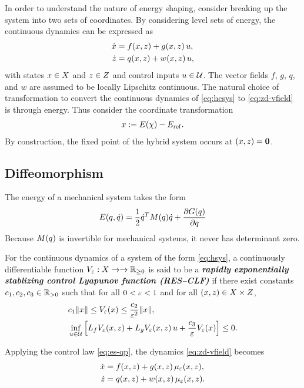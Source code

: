 \documentclass[twocolumn]{article}
\begin{document}
In order to understand the nature of energy shaping, consider breaking up the system into two sets of coordinates.
%
By considering level sets of energy, the continuous dynamics can be expressed as
\begin{align}
  \nonumber
  \dot {x} &= f(x, z) + g(x, z) \, u,\\
  \dot {z} &= q(x, z) + w(x, z) \, u,
  \label{eq:zd-vfield}
\end{align}
%
with states $x \in X$ and $z \in Z$ and control inputs $u \in \mathcal{U}$.
%
The vector fields $f$, $g$, $q$, and $w$ are assumed to be locally Lipschitz continuous.
%
The natural choice of transformation to convert the continuous dynamics of \eqref{eq:hcsys} to \eqref{eq:zd-vfield} is through energy.
%
Thus consider the coordinate transformation
\begin{align}
  x := E(\chi) - E_{\mathrm{ref}}.
\end{align}
By construction, the fixed point of the hybrid system occurs at $(x, z) = {\mathbf 0}$.
%

\subsection{Diffeomorphism}
The energy of a mechanical system takes the form
\begin{align}
  E(q, \dot{q}) = \frac{1}{2} \dot{q}^{T} M(q) \dot{q} + \frac{\partial{G(q)}}{\partial{q}}
\end{align}
Because $M(q)$ is invertible for mechanical systems, it never has determinant zero.

\begin{definition}
  For the continuous dynamics of a system of the form \eqref{eq:hsys}, a continuously differentiable function $V_{\varepsilon} : X \to \to \mathbb{R}_{\geq 0}$ is said to be a {\bf \em rapidly exponentially stablizing control Lyapunov function (RES--CLF)} if there exist constants $c_{1}, c_{2}, c_{3} \in \mathbb{R}_{> 0}$ such that for all $0 < \varepsilon < 1$ and for all $(x, z) \in X \times Z$,
  \begin{align}
    &c_{1} \| x \| \leq V_{\varepsilon}(x) \leq \frac{c_{2}}{\varepsilon^{2}} \| x \|,\\
    \nonumber
    &\inf_{u \in \mathcal{U}} \left[ L_{f} V_{\varepsilon}(x, z) + L_{g} V_{\varepsilon}(x, z) \, u + \frac{c_{3}}{\varepsilon} V_{\varepsilon}(x) \right] \leq 0.
  \end{align}
\end{definition}


Applying the control law \eqref{eq:es-qp}, the dynamics \eqref{eq:zd-vfield} becomes
\begin{align}
  \nonumber
  \dot {x} &= f(x, z) + g(x, z) \, \mu_{\varepsilon}(x, z),\\
  \dot {z} &= q(x, z) + w(x, z) \, \mu_{\varepsilon}(x, z).
  \label{eq:zd-vfield-cl}
\end{align}
\end{document}
